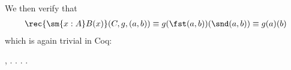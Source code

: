 We then verify that
\begin{align*}
\rec{\sm{x:A}B(x)}(C, g, (a, b))
\equiv g(\fst (a, b))(\snd (a, b))
\equiv g(a)(b)
\end{align*}
which is again trivial in Coq: \begin{coqdoccode}
\coqdocemptyline
\coqdocnoindent
{} \coqdockw{\ensuremath{\forall}}    ,    \coqdocnotation{(}\coqdocnotation{;} \coqdocnotation{)} \coqdocnotation{=}   . . .\coqdoceol
\coqdocemptyline
\coqdocnoindent
{} .\coqdoceol
\coqdocemptyline
\end{coqdoccode}


